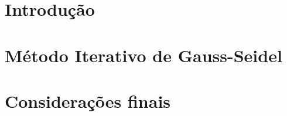 \documentclass[
	article,			%
	11pt,				%
	oneside,			%
	a4paper,			%
	sumario=tradicional
	]{abntex2}
\begin{document}
\frenchspacing


\maketitle


\textual

\section*{Introdução}

\section{Método Iterativo de Gauss-Seidel}

\section*{Considerações finais}

\postextual
\end{document}

